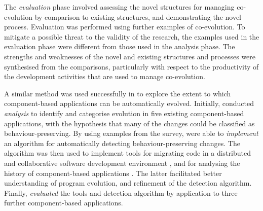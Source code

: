 The \emph{evaluation} phase involved assessing the novel structures for managing co-evolution by comparison to existing structures, and demonstrating the novel process. Evaluation was performed using further examples of co-evolution. To mitigate a possible threat to the validity of the research, the examples used in the evaluation phase were different from those used in the analysis phase. The strengths and weaknesses of the novel and existing structures and processes were synthesised from the comparisons, particularly with respect to the productivity of the development activities that are used to manage co-evolution.

A similar method was used successfully in \cite{dig07thesis} to explore the extent to which component-based applications can be automatically evolved. Initially, \cite{dig06apis} conducted \emph{analysis} to identify and categorise evolution in five existing component-based applications, with the hypothesis that many of the changes could be classified as behaviour-preserving. By using examples from the survey, \cite{dig06detection} were able to \emph{implement} an algorithm for automatically detecting behaviour-preserving changes. The algorithm was then used to implement tools for migrating code in a distributed and collaborative software development environment \cite{dig06automatic}, and for analysing the history of component-based applications \cite{dig07cms}. The latter facilitated better understanding of program evolution, and refinement of the detection algorithm. Finally, \cite{dig07thesis} \emph{evaluated} the tools and detection algorithm by application to three further component-based applications.